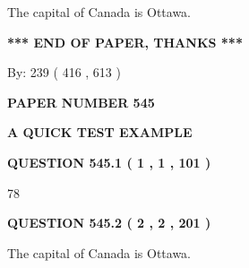 \documentclass[12pt]{article}
\begin{document}
  
 
 
\noindent{}
 
 
The capital of Canada is Ottawa.
 
 
 
 
   
   
 \vspace{0.2in}
 
   
   
   
   
\vspace{1.0in} 
{\textbf{\large{ *** END OF PAPER, THANKS *** }}} 
   
   
\hspace{1.0in} By: 
 239 ( 416 ,  613 )
   
   
   
   
\newpage 
\setcounter{page}{ 
   545001 } 
   
   
   
   
 {\textbf{ \Large{ PAPER NUMBER  545  }}}
   
   
\vspace{0.2in}
   
   
   
   
   
   
 \vspace{0.2in}
{\LARGE {\textbf{ A QUICK TEST EXAMPLE}}}
   
   
  
\vspace{0.2in}
  
{\textbf{\Large{QUESTION
545.1 
 ( 1 , 1 , 101 )
}}}
  
  
 
 
\noindent{}

78
 
 
  
\vspace{0.2in}
  
{\textbf{\Large{QUESTION
545.2 
 ( 2 , 2 , 201 )
}}}
  
  
 
 
\noindent{}
 
 
The capital of Canada is Ottawa.
 
\end{document}
